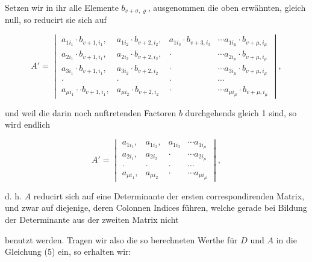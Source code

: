 Setzen wir in ihr alle Elemente $b_{v+\sigma,\varrho}$, ausgenommen die oben erw\"ahnten, gleich null, so reducirt sie sich auf

\[
A' =
\begin{vmatrix}
a_{1i_1}\cdot b_{v+1,i_1}, & a_{1i_2}\cdot b_{v+2,i_2}, & a_{1i_3}\cdot b_{v+3,i_3} & \cdots a_{1i_\mu}\cdot b_{v+\mu,i_\mu} \\
a_{2i_1}\cdot b_{v+1,i_1}, & a_{2i_2}\cdot b_{v+2,i_2}, & \cdot & \cdots a_{2i_\mu}\cdot b_{v+\mu,i_\mu} \\
a_{3i_1}\cdot b_{v+1,i_1}, & a_{3i_2}\cdot b_{v+2,i_2} & \cdot & \cdots a_{3i_\mu}\cdot b_{v+\mu,i_\mu} \\
\cdot & \cdot & \cdot & \cdots \\
a_{\mu i_1}\cdot\cdot b_{v+1,i_1}, & a_{\mu i_2}\cdot b_{v+2,i_2} & \cdot & \cdots a_{\mu i_\mu}\cdot b_{v+\mu,i_\mu}
\end{vmatrix},
\]

und weil die darin noch auftretenden Factoren $b$ durchgehends gleich 1 sind, so wird endlich

\[
A' =
\begin{vmatrix}
a_{1i_1}, & a_{1i_2}, & a_{1i_3} & \cdots a_{1i_\mu} \\
a_{2i_1}, & a_{2i_2} & \cdot & \cdots a_{2i_\mu} \\
\cdot & \cdot & \cdot & \cdots \\
a_{\mu i_1}, & a_{\mu i_2} & \cdot & \cdots a_{\mu i_\mu}
\end{vmatrix},
\]

d. h. $A$ reducirt sich auf eine Determinante der ersten correspondirenden Matrix, und zwar auf diejenige, deren Colonnen Indices f\"uhren, welche gerade bei Bildung der Determinante aus der zweiten Matrix nicht


benutzt werden. Tragen wir also die so berechneten Werthe f\"ur $D$ und $A$ in die Gleichung (5) ein, so erhalten wir:


